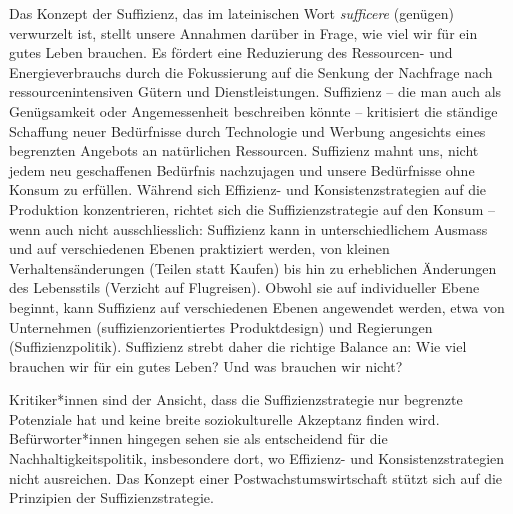 \documentclass[
  nswissgerman,
  a4paper,
  openany]{book}
\begin{document}
Das Konzept der Suffizienz, das im lateinischen Wort \emph{sufficere}
(genügen) verwurzelt ist, stellt unsere Annahmen darüber in Frage, wie
viel wir für ein gutes Leben brauchen. Es fördert eine Reduzierung des
Ressourcen- und Energieverbrauchs durch die Fokussierung auf die Senkung
der Nachfrage nach ressourcenintensiven Gütern und Dienstleistungen.
Suffizienz -- die man auch als Genügsamkeit oder Angemessenheit
beschreiben könnte -- kritisiert die ständige Schaffung neuer
Bedürfnisse durch Technologie und Werbung angesichts eines begrenzten
Angebots an natürlichen Ressourcen. Suffizienz mahnt uns, nicht jedem
neu geschaffenen Bedürfnis nachzujagen und unsere Bedürfnisse ohne
Konsum zu erfüllen. Während sich Effizienz- und Konsistenzstrategien auf
die Produktion konzentrieren, richtet sich die Suffizienzstrategie auf
den Konsum -- wenn auch nicht ausschliesslich: Suffizienz kann in
unterschiedlichem Ausmass und auf verschiedenen Ebenen praktiziert
werden, von kleinen Verhaltensänderungen (Teilen statt Kaufen) bis hin
zu erheblichen Änderungen des Lebensstils (Verzicht auf Flugreisen).
Obwohl sie auf individueller Ebene beginnt, kann Suffizienz auf
verschiedenen Ebenen angewendet werden, etwa von Unternehmen
(suffizienzorientiertes Produktdesign) und Regierungen
(Suffizienzpolitik). Suffizienz strebt daher die richtige Balance an:
Wie viel brauchen wir für ein gutes Leben? Und was brauchen wir nicht?

Kritiker*innen sind der Ansicht, dass die Suffizienzstrategie nur
begrenzte Potenziale hat und keine breite soziokulturelle Akzeptanz
finden wird. Befürworter*innen hingegen sehen sie als entscheidend für
die Nachhaltigkeitspolitik, insbesondere dort, wo Effizienz- und
Konsistenzstrategien nicht ausreichen. Das Konzept einer
Postwachstumswirtschaft stützt sich auf die Prinzipien der
Suffizienzstrategie.
\end{document}
